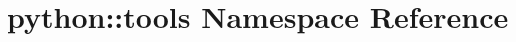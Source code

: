 \hypertarget{namespacepython_1_1tools}{
\section{python::tools Namespace Reference}
\label{namespacepython_1_1tools}
}
